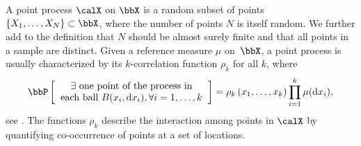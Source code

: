 \documentclass[twoside,11pt]{article}
\begin{document}
        A point process $\calX$ on $\bbX$ is a random subset of points $\lrcb{X_1, \dots, X_N} \subset \bbX$, where the number of points $N$ is itself random.
        We further add to the definition that $N$ should be almost surely finite and that all points in a sample are distinct.
        Given a reference measure $\mu$ on~$\bbX$, a point process is usually characterized by its $k$-correlation function $\rho_k$ for all $k$, where
        \begin{equation*}
        \label{eq:correlation_function_intuition}
            \Proba{
                \begin{tabular}{c}
                    $\exists$ one point of the process in\\
                    each ball $B(x_i, \diff x_i), \forall i=1,\dots, k $
                \end{tabular}
            }
            = \rho_k\lrp{x_1,\dots,x_k}
                \prod_{i=1}^k \mu(\diff x_i),
        \end{equation*}
        see \citet[Section 4]{MoWa04}.
        The functions $\rho_k$ describe the interaction among points in $\calX$ by quantifying co-occurrence of points at a set of locations.

\end{document}
